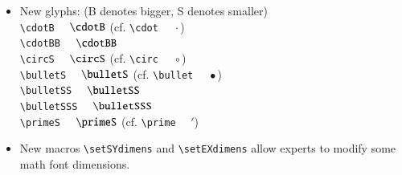 \documentclass[11pt]{article}
\theoremstyle{oldplain}
\theoremstyle{plain}
\begin{document}
\begin{itemize}
\verb|\hattilde|$\quad\hattilde{}$\\
\verb|\hathat|$\quad\hathat{}$\\
\item New glyphs: (B denotes bigger, S denotes smaller)\\
\verb|\cdotB| $\quad\cdotB$ (cf. \verb|\cdot| $\quad\cdot$)\\
\verb|\cdotBB| $\quad\cdotBB$\\
\verb|\circS| $\quad\circS$ (cf. \verb|\circ| $\quad\circ$)\\
\verb|\bulletS| $\quad\bulletS$ (cf. \verb|\bullet| $\quad\bullet$)\\
\verb|\bulletSS| $\quad\bulletSS$\\
\verb|\bulletSSS| $\quad\bulletSSS$\\
\verb|\primeS| $\quad\primeS$ (cf. \verb|\prime| $\quad\prime$)\\

\item New macros \verb|\setSYdimens| and \verb|\setEXdimens| allow experts to modify some math font dimensions.

\end{itemize}
\end{document}
